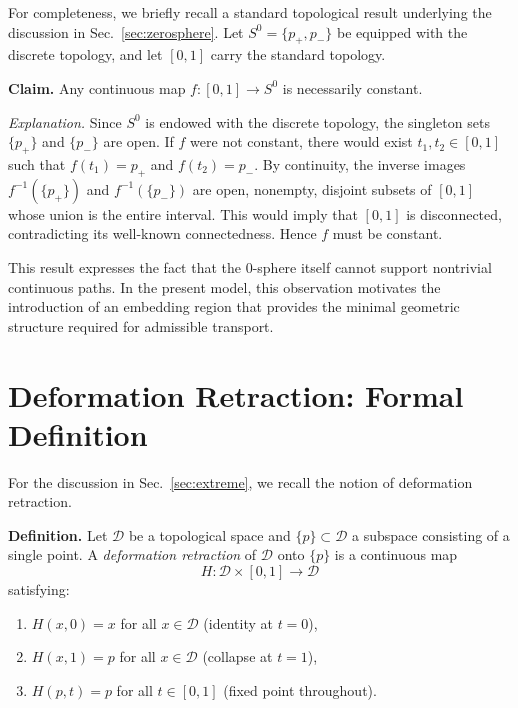\documentclass[%
 reprint,
 amsmath,amssymb,
 aps,
 prb,
]{revtex4-2}
\numberwithin{equation}{section}
\begin{document}
For completeness, we briefly recall a standard topological result underlying the discussion in Sec.~\ref{sec:zerosphere}.
Let $S^{0}=\{p_{+},p_{-}\}$ be equipped with the discrete topology, and let $[0,1]$ carry the standard topology.

\medskip
\noindent\textbf{Claim.}
Any continuous map $f:[0,1]\to S^{0}$ is necessarily constant.

\medskip
\noindent\textit{Explanation.}
Since $S^{0}$ is endowed with the discrete topology, the singleton sets $\{p_{+}\}$ and $\{p_{-}\}$ are open.
If $f$ were not constant, there would exist $t_{1},t_{2}\in[0,1]$ such that
$f(t_{1})=p_{+}$ and $f(t_{2})=p_{-}$.
By continuity, the inverse images $f^{-1}(\{p_{+}\})$ and $f^{-1}(\{p_{-}\})$ are open, nonempty, disjoint subsets of $[0,1]$ whose union is the entire interval.
This would imply that $[0,1]$ is disconnected, contradicting its well-known connectedness.
Hence $f$ must be constant.

\medskip
This result expresses the fact that the 0-sphere itself cannot support nontrivial continuous paths.
In the present model, this observation motivates the introduction of an embedding region that provides the minimal geometric structure required for admissible transport.

\section{Deformation Retraction: Formal Definition}
\label{sec:appendix_deformation}

For the discussion in Sec.~\ref{sec:extreme}, we recall the notion of deformation retraction.

\medskip
\noindent\textbf{Definition.}
Let $\mathcal{D}$ be a topological space and $\{p\} \subset \mathcal{D}$ a subspace consisting of a single point. A \textit{deformation retraction} of $\mathcal{D}$ onto $\{p\}$ is a continuous map
\begin{equation}
H : \mathcal{D} \times [0,1] \to \mathcal{D}
\end{equation}
satisfying:
\begin{enumerate}
\item $H(x,0) = x$ for all $x \in \mathcal{D}$ (identity at $t=0$),
\item $H(x,1) = p$ for all $x \in \mathcal{D}$ (collapse at $t=1$),
\item $H(p,t) = p$ for all $t \in [0,1]$ (fixed point throughout).
\end{enumerate}
\end{document}
